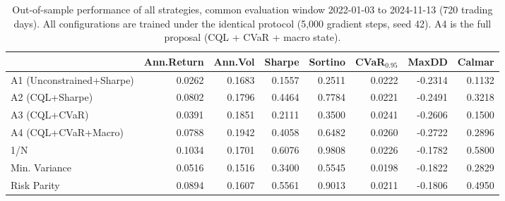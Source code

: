 \begin{table}
\caption{Out-of-sample performance of all strategies, common evaluation window 2022-01-03 to 2024-11-13 (720 trading days). All configurations are trained under the identical protocol (5{,}000 gradient steps, seed 42). A4 is the full proposal (CQL + CVaR + macro state).}
\label{tab:main_results}
\begin{tabular}{lrrrrrrr}
\toprule
 & Ann.Return & Ann.Vol & Sharpe & Sortino & CVaR$_{0.95}$ & MaxDD & Calmar \\
\midrule
A1 (Unconstrained+Sharpe) & 0.0262 & 0.1683 & 0.1557 & 0.2511 & 0.0222 & -0.2314 & 0.1132 \\
A2 (CQL+Sharpe) & 0.0802 & 0.1796 & 0.4464 & 0.7784 & 0.0221 & -0.2491 & 0.3218 \\
A3 (CQL+CVaR) & 0.0391 & 0.1851 & 0.2111 & 0.3500 & 0.0241 & -0.2606 & 0.1500 \\
A4 (CQL+CVaR+Macro) & 0.0788 & 0.1942 & 0.4058 & 0.6482 & 0.0260 & -0.2722 & 0.2896 \\
1/N & 0.1034 & 0.1701 & 0.6076 & 0.9808 & 0.0226 & -0.1782 & 0.5800 \\
Min. Variance & 0.0516 & 0.1516 & 0.3400 & 0.5545 & 0.0198 & -0.1822 & 0.2829 \\
Risk Parity & 0.0894 & 0.1607 & 0.5561 & 0.9013 & 0.0211 & -0.1806 & 0.4950 \\
\bottomrule
\end{tabular}
\end{table}
